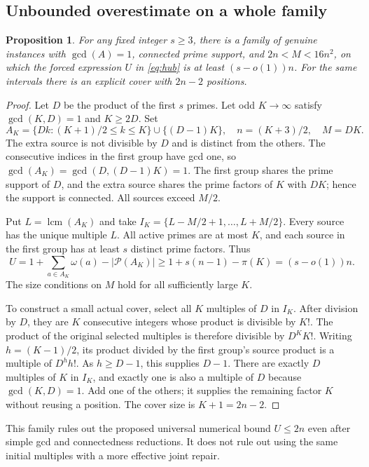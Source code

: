 \documentclass[11pt,a4paper]{article}
\newtheorem{proposition}[theorem]{Proposition}
\theoremstyle{remark}
\DeclareMathOperator{\lcm}{lcm}
\newcommand{\PP}{\mathcal P}
\begin{document}
\subsection{Unbounded overestimate on a whole family}
\begin{proposition}\label{prop:family}
For any fixed integer $s\ge3$, there is a family of genuine instances
with $\gcd(A)=1$, connected prime support, and $2n<M<16n^2$, on which
the forced expression $U$ in \eqref{eq:hub} is at least $(s-o(1))n$.
For the same intervals there is an explicit cover with $2n-2$ positions.
\end{proposition}
\begin{proof}
Let $D$ be the product of the first $s$ primes. Let odd $K\to\infty$
satisfy $\gcd(K,D)=1$ and $K\ge2D$. Set
\[
 A_K=\{Dk:(K+1)/2\le k\le K\}\cup\{(D-1)K\},
 \quad n=(K+3)/2,\quad M=DK.
\]
The extra source is not divisible by $D$ and is distinct from the others.
The consecutive indices in the first group have gcd one, so
$\gcd(A_K)=\gcd(D,(D-1)K)=1$. The first group shares the prime support
of $D$, and the extra source shares the prime factors of $K$ with $DK$;
hence the support is connected. All sources exceed $M/2$.

Put $L=\lcm(A_K)$ and take
$I_K=\{L-M/2+1,\ldots,L+M/2\}$. Every source has the unique multiple
$L$. All active primes are at most $K$, and each source in the first
group has at least $s$ distinct prime factors. Thus
\[
 U=1+\sum_{a\in A_K}\omega(a)-|\PP(A_K)|
 \ge1+s(n-1)-\pi(K)=(s-o(1))n.
\]
The size conditions on $M$ hold for all sufficiently large $K$.

To construct a small actual cover, select all $K$ multiples of $D$ in
$I_K$. After division by $D$, they are $K$ consecutive integers whose
product is divisible by $K!$. The product of the original selected
multiples is therefore divisible by $D^K K!$. Writing $h=(K-1)/2$, its
product divided by the first group's source product is a multiple of
$D^h h!$. As $h\ge D-1$, this supplies $D-1$. There are exactly $D$
multiples of $K$ in $I_K$, and exactly one is also a multiple of $D$
because $\gcd(K,D)=1$. Add one of the others; it supplies the remaining
factor $K$ without reusing a position. The cover size is
$K+1=2n-2$.
\end{proof}

This family rules out the proposed universal numerical bound $U\le2n$
even after simple gcd and connectedness reductions. It does not rule out
using the same initial multiples with a more effective joint repair.
\end{document}
